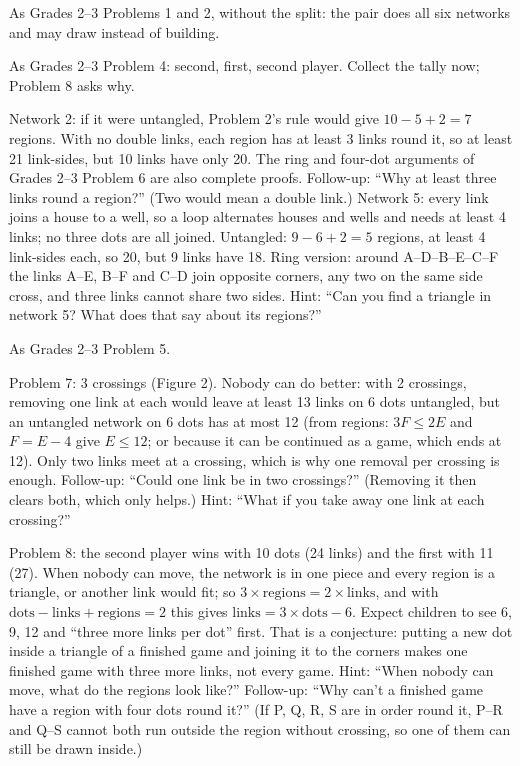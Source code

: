As Grades 2--3 Problems 1 and 2, without the split: the pair does all six networks and may draw instead of building.

As Grades 2--3 Problem 4: second, first, second player. Collect the tally now; Problem 8 asks why.

Network 2: if it were untangled, Problem 2's rule would give $10-5+2=7$ regions. With no double links, each region has at least 3 links round it, so at least 21 link-sides, but 10 links have only 20. The ring and four-dot arguments of Grades 2--3 Problem 6 are also complete proofs. Follow-up: ``Why at least three links round a region?'' (Two would mean a double link.)
Network 5: every link joins a house to a well, so a loop alternates houses and wells and needs at least 4 links; no three dots are all joined. Untangled: $9-6+2=5$ regions, at least 4 link-sides each, so 20, but 9 links have 18. Ring version: around A--D--B--E--C--F the links A--E, B--F and C--D join opposite corners, any two on the same side cross, and three links cannot share two sides. Hint: ``Can you find a triangle in network 5? What does that say about its regions?''

As Grades 2--3 Problem 5.

Problem 7: 3 crossings (Figure 2). Nobody can do better: with 2 crossings, removing one link at each would leave at least 13 links on 6 dots untangled, but an untangled network on 6 dots has at most 12 (from regions: $3F\le 2E$ and $F=E-4$ give $E\le 12$; or because it can be continued as a game, which ends at 12). Only two links meet at a crossing, which is why one removal per crossing is enough. Follow-up: ``Could one link be in two crossings?'' (Removing it then clears both, which only helps.) Hint: ``What if you take away one link at each crossing?''

Problem 8: the second player wins with 10 dots (24 links) and the first with 11 (27). When nobody can move, the network is in one piece and every region is a triangle, or another link would fit; so $3\times\text{regions}=2\times\text{links}$, and with $\text{dots}-\text{links}+\text{regions}=2$ this gives $\text{links}=3\times\text{dots}-6$. Expect children to see 6, 9, 12 and ``three more links per dot'' first. That is a conjecture: putting a new dot inside a triangle of a finished game and joining it to the corners makes one finished game with three more links, not every game. Hint: ``When nobody can move, what do the regions look like?'' Follow-up: ``Why can't a finished game have a region with four dots round it?'' (If P, Q, R, S are in order round it, P--R and Q--S cannot both run outside the region without crossing, so one of them can still be drawn inside.)

